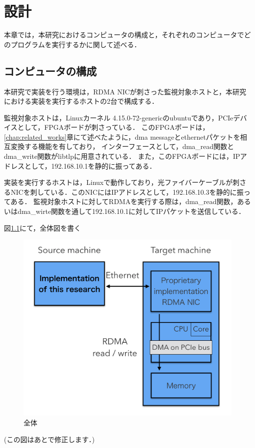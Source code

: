 \chapter{設計}
\label{chap:design}

本章では，本研究におけるコンピュータの構成と，それぞれのコンピュータでどのプログラムを実行するかに関して述べる．

\section{コンピュータの構成}

本研究で実装を行う環境は，RDMA NICが刺さった監視対象ホストと，本研究における実装を実行するホストの2台で構成する．

監視対象ホストは，Linuxカーネル 4.15.0-72-genericのubuntuであり，PCIeデバイスとして，FPGAボードが刺さっている．
このFPGAボードは，\ref{chap:related_works}章にて述べたように，dma messageとethernetパケットを相互変換する機能を有しており，
インターフェースとして，dma_read関数とdma_write関数がlibtlpに用意されている．
また，このFPGAボードには，IPアドレスとして，192.168.10.1を静的に振ってある．

実装を実行するホストは，Linuxで動作しており，光ファイバーケーブルが刺さるNICを刺している．このNICにはIPアドレスとして，192.168.10.3を静的に振ってある．
監視対象ホストに対してRDMAを実行する際は，dma_read関数，あるいはdma_wirte関数を通して192.168.10.1に対してIPパケットを送信している．

図\ref{fig:zentai}にて，全体図を書く

\begin{figure}[htbp]
    \caption{全体}
    \label{fig:zentai}
    \begin{center}
        \includegraphics[bb=0 0 1000 530,width=15cm]{img/zentai.png}
    \end{center}
\end{figure}

(この図はあとで修正します．)
